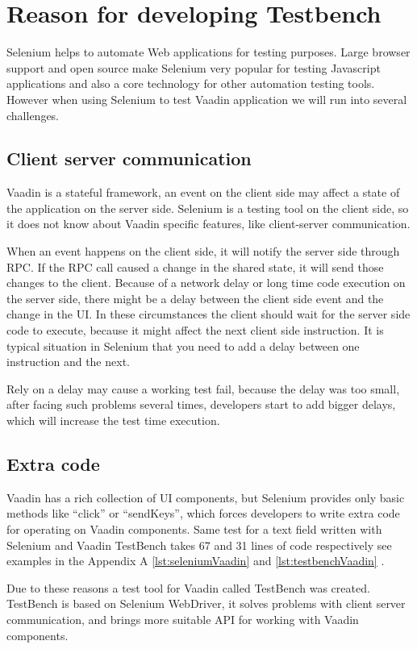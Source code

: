 \chapter{Reason for developing Testbench}
\label{ch:reasontestbenchdevelopment}
Selenium helps to automate Web applications for testing purposes. Large browser
support and open source make Selenium very popular for testing Javascript applications
and also a core technology for other automation testing tools. However when
using Selenium to test Vaadin application we will run into several challenges.

\section{Client server communication}
Vaadin is a stateful framework, an event on the client side may affect a state
of the application on the server side. Selenium is a testing tool on the client side, 
so it does not know about Vaadin specific features, like client-server communication. 

When an event happens on the client side, it will notify the server side through RPC.
If the RPC call caused a change in the shared state, it will send those changes to the client.
Because of a network delay or long time code execution on the server side, 
there might be a delay between the client side event and the change in the UI.
In these circumstances the client should wait for the server side code to execute,
because it might affect the next client side instruction.  
It is typical situation in Selenium that you need to add a delay between one instruction and the next.

Rely on a delay may cause a working test fail, because the delay was too small,
after facing such problems several times, developers start to add bigger delays,
which will increase the test time execution. 

\section{Extra code}
 Vaadin has a rich collection of UI components, but Selenium provides only
 basic methods like ``click'' or ``sendKeys'', which forces developers to write
 extra code for operating on Vaadin components. Same test for a text field
 written with Selenium  and Vaadin TestBench takes 67 and 31 lines of code
 respectively see examples in the Appendix A \ref{lst:seleniumVaadin} and
 \ref{lst:testbenchVaadin} .
   
 Due to these reasons a test tool for Vaadin called TestBench was created.
 TestBench is based on Selenium WebDriver, it solves  problems with client server communication,
 and brings more suitable API for working with Vaadin components.
